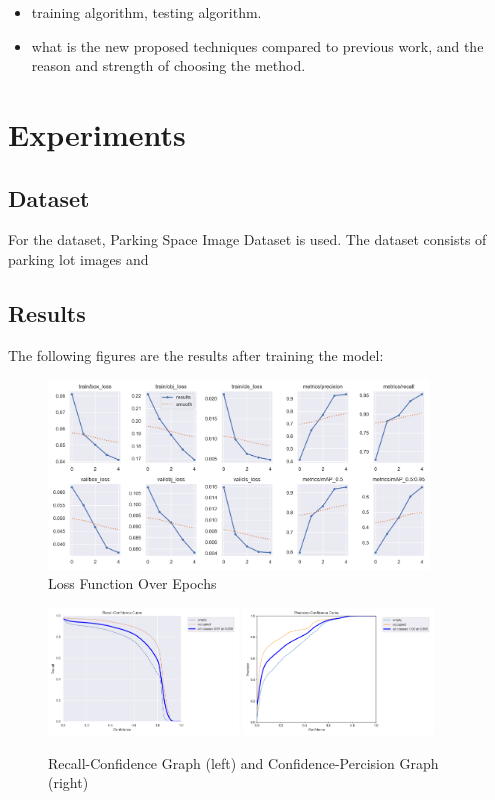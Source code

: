 \documentclass{article}
\begin{document}
\begin{itemize}
    \item training algorithm, testing algorithm.
    \item what is the new proposed techniques compared to previous work, and the reason and strength of choosing the method.
\end{itemize}

\section{Experiments}

\subsection{Dataset}
For the dataset, Parking Space Image Dataset is used. The dataset consists of parking lot images and  

\subsection{Results}

The following figures are the results after training the model: 
\begin{figure}[ht]
    \centering
    \includegraphics[width=0.9\textwidth]{figs/loss-function.png}
    \caption{Loss Function Over Epochs}
\end{figure}
\begin{figure}[ht]
    \centering
    \includegraphics[width=0.45\textwidth]{figs/recall-confidence.png}
    \includegraphics[width=0.45\textwidth]{figs/percision-confidence.png}
    \caption{Recall-Confidence Graph (left) and Confidence-Percision Graph (right) }
\end{figure}
\end{document}
